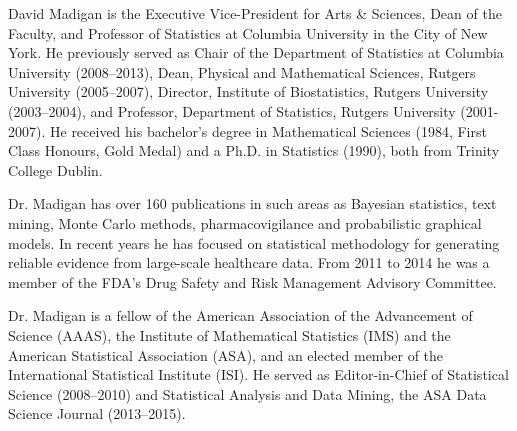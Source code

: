 \small David Madigan is the Executive Vice-President for Arts \& Sciences,
Dean of the Faculty, and Professor of Statistics at Columbia
University in the City of New York. He previously served as Chair of
the Department of Statistics at Columbia University (2008--2013), Dean,
Physical and Mathematical Sciences, Rutgers University (2005--2007),
Director, Institute of Biostatistics, Rutgers University (2003--2004),
and Professor, Department of Statistics, Rutgers University
(2001-2007).  He received his bachelor's degree in Mathematical
Sciences (1984, First Class Honours, Gold Medal) and a Ph.D. in
Statistics (1990), both from Trinity College Dublin.

Dr. Madigan has over 160 publications in such areas as Bayesian statistics,
text mining, Monte Carlo methods, pharmacovigilance and probabilistic
graphical models. In recent years he has focused on statistical
methodology for generating reliable evidence from large-scale
healthcare data. From 2011 to 2014 he was a member of the FDA's
Drug Safety and Risk Management Advisory Committee.

Dr. Madigan is a fellow of the American Association of the Advancement
of Science (AAAS), the Institute of Mathematical Statistics (IMS) and
the American Statistical Association (ASA), and an elected member of
the International Statistical Institute (ISI).  He served as
Editor-in-Chief of Statistical Science (2008--2010) and Statistical
Analysis and Data Mining, the ASA Data Science Journal (2013--2015).

\normalsize

